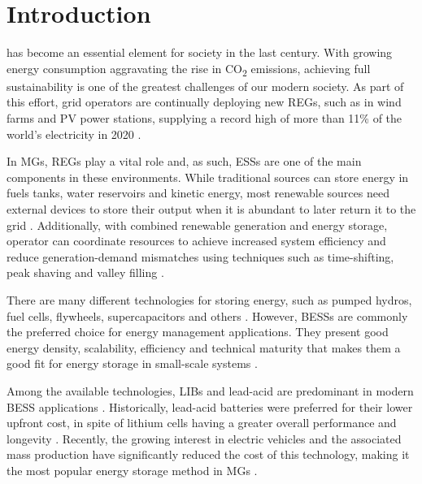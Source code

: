 \documentclass{ieeeaccess}
\begin{document}
    \maketitle

    \section{Introduction}
    \label{sec:introduction}
     has become an essential element for society in the last century. With growing energy consumption aggravating the rise in CO\textsubscript{2} emissions, achieving full sustainability is one of the greatest challenges of our modern society. As part of this effort, grid operators are continually deploying new \acp{REG}, such as in wind farms and \ac{PV} power stations, supplying a record high of more than 11\% of the world's electricity in 2020 \cite{EMBER2021}.

    In \acp{MG}, \acp{REG} play a vital role and, as such, \acp{ESS} are one of the main components in these environments. While traditional sources can store energy in fuels tanks, water reservoirs and kinetic energy, most renewable sources need external devices to store their output when it is abundant to later return it to the grid \cite{STECCA2020}. Additionally, with combined renewable generation and energy storage,  operator can coordinate resources to achieve increased system efficiency and reduce generation-demand mismatches using techniques such as time-shifting, peak shaving and valley filling \cite{WANG20196201, LI2020106058, PARRA2015576, ZHANG2019772}.

    There are many different technologies for storing energy, such as pumped hydros, fuel cells, flywheels, supercapacitors and others \cite{IBRAHIM2008}. However, \acp{BESS} are commonly the preferred choice for energy management applications. They present good energy density, scalability, efficiency and technical maturity that makes them a good fit for energy storage in small-scale systems \cite{KOCER2019, martins2018optimal, FU20136749070}.

    Among the available technologies, \acp{LIB} and lead-acid are predominant in modern \ac{BESS} applications \cite{FU20136749070, ALSAIDAN8094981}. Historically, lead-acid batteries were preferred for their lower upfront cost, in spite of lithium cells having a greater overall performance and longevity \cite{wang2013li, xu2010lithium}. Recently, the growing interest in electric vehicles and the associated mass production have significantly reduced the cost of this technology, making it the most popular energy storage method in \acp{MG} \cite{mongird20202020, BBERG2020, zhang2018energy}.
\end{document}
